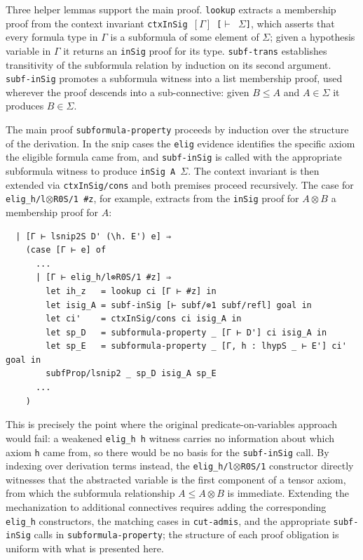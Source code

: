 Three helper lemmas support the main proof. \texttt{lookup} extracts a
membership proof from the context invariant \texttt{ctxInSig~$[\Gamma]$~[{$\vdash$}~{$\Sigma$}]},
which asserts that every formula type in $\Gamma$ is a subformula of
some element of $\Sigma$; given a hypothesis variable in $\Gamma$ it
returns an \texttt{inSig} proof for its type. \texttt{subf-trans}
establishes transitivity of the subformula relation by induction on its
second argument. \texttt{subf-inSig} promotes a subformula witness into
a list membership proof, used wherever the proof descends into a
sub-connective: given $B \leq A$ and $A \in \Sigma$ it produces
$B \in \Sigma$.

The main proof \texttt{subformula-property} proceeds by induction over
the structure of the derivation. In the snip cases the \texttt{elig}
evidence identifies the specific axiom the eligible formula came from,
and \texttt{subf-inSig} is called with the appropriate subformula
witness to produce \texttt{inSig A $\Sigma$}. The context invariant is then
extended via \texttt{ctxInSig/cons} and both premises proceed
recursively. The case for \texttt{elig\_h/l$\otimes$R0S/1~\#z}, for example,
extracts from the \texttt{inSig} proof for $A \otimes B$ a membership
proof for $A$:

\begin{lstlisting}
  | [Γ ⊢ lsnip2S D' (\h. E') e] ⇒
    (case [Γ ⊢ e] of
      ...
      | [Γ ⊢ elig_h/l⊗R0S/1 #z] ⇒
        let ih_z   = lookup ci [Γ ⊢ #z] in
        let isig_A = subf-inSig [⊢ subf/⊗1 subf/refl] goal in
        let ci'    = ctxInSig/cons ci isig_A in
        let sp_D   = subformula-property _ [Γ ⊢ D'] ci isig_A in
        let sp_E   = subformula-property _ [Γ, h : lhypS _ ⊢ E'] ci' goal in
        subfProp/lsnip2 _ sp_D isig_A sp_E
      ...
    )
\end{lstlisting}

This is precisely the point where the original predicate-on-variables
approach would fail: a weakened \texttt{elig\_h h} witness carries no
information about which axiom \texttt{h} came from, so there would be no
basis for the \texttt{subf-inSig} call. By indexing over derivation terms
instead, the \texttt{elig\_h/l$\otimes$R0S/1} constructor directly witnesses
that the abstracted variable is the first component of a tensor axiom,
from which the subformula relationship $A \leq A \otimes B$ is immediate.
Extending the mechanization to additional connectives requires adding the
corresponding \texttt{elig\_h} constructors, the matching cases in
\texttt{cut-admis}, and the appropriate \texttt{subf-inSig} calls in
\texttt{subformula-property}; the structure of each proof obligation is
uniform with what is presented here.

